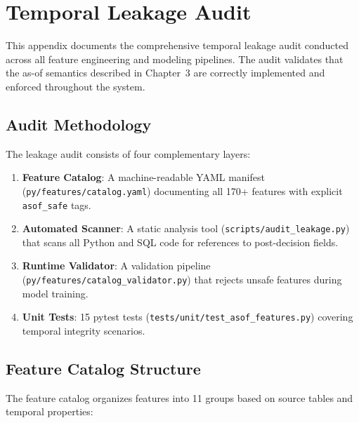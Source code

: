 
\chapter{Temporal Leakage Audit}
\label{app:leakage_audit}

This appendix documents the comprehensive temporal leakage audit conducted across all feature engineering and modeling pipelines. The audit validates that the as-of semantics described in Chapter~3 are correctly implemented and enforced throughout the system.

\section{Audit Methodology}

The leakage audit consists of four complementary layers:

\begin{enumerate}
\item \textbf{Feature Catalog}: A machine-readable YAML manifest (\texttt{py/features/catalog.yaml}) documenting all 170+ features with explicit \texttt{asof\_safe} tags.

\item \textbf{Automated Scanner}: A static analysis tool (\texttt{scripts/audit\_leakage.py}) that scans all Python and SQL code for references to post-decision fields.

\item \textbf{Runtime Validator}: A validation pipeline (\texttt{py/features/catalog\_validator.py}) that rejects unsafe features during model training.

\item \textbf{Unit Tests}: 15 pytest tests (\texttt{tests/unit/test\_asof\_features.py}) covering temporal integrity scenarios.
\end{enumerate}

\section{Feature Catalog Structure}

The feature catalog organizes features into 11 groups based on source tables and temporal properties:

